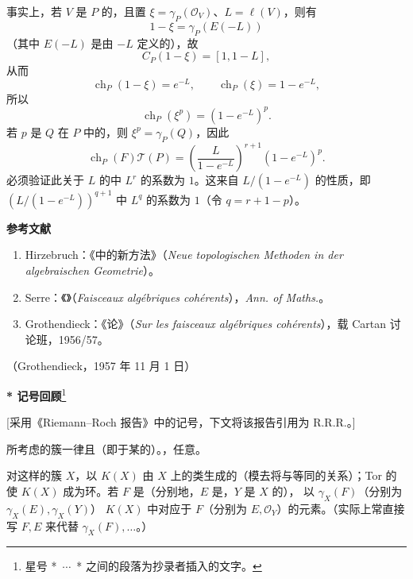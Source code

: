 事实上，若 $V$ 是 $P$ 的，且置 $\xi=\gamma_P(\mathcal O_V)$、$L=\ell(V)$，则有
\[
1-\xi=\gamma_P(E(-L))
\]
（其中 $E(-L)$ 是由 $-L$ 定义的），故
\[
C_P(1-\xi)=[1,1-L],
\]
从而
\[
\operatorname{ch}_P(1-\xi)=e^{-L},\qquad
\operatorname{ch}_P(\xi)=1-e^{-L},
\]
所以
\[
\operatorname{ch}_P(\xi^p)=(1-e^{-L})^p.
\]
若 $p$ 是 $Q$ 在 $P$ 中的，则 $\xi^p=\gamma_P(Q)$，因此
\[
\operatorname{ch}_P(F)\mathscr T(P)=\left(\frac{L}{1-e^{-L}}\right)^{r+1}(1-e^{-L})^p.
\]
必须验证此关于 $L$ 的中 $L^r$ 的系数为 $1$。这来自 $L/(1-e^{-L})$ 的性质，即 $(L/(1-e^{-L}))^{q+1}$ 中 $L^q$ 的系数为 $1$（令 $q=r+1-p$）。

\textbf{参考文献}
\begin{enumerate}
\item[{[1]}] Hirzebruch：《中的新方法》（\textit{Neue topologischen Methoden in der algebraischen Geometrie}）。
\item[{[2]}] Serre：《》（\textit{Faisceaux algébriques cohérents}），\textit{Ann. of Maths.}。
\item[{[3]}] Grothendieck：《论》（\textit{Sur les faisceaux algébriques cohérents}），载 Cartan 讨论班，1956/57。
\end{enumerate}

\begin{center}（Grothendieck，1957 年 11 月 1 日）\end{center}
\textbf{* 记号回顾}\footnote{星号 *\ $\cdots$\ * 之间的段落为抄录者插入的文字。}

[采用《Riemann--Roch 报告》中的记号，下文将该报告引用为 R.R.R.。]

所考虑的簇一律且（即于某的）。，任意。

对这样的簇 $X$，以 $K(X)$ 由 $X$ 上的类生成的（模去将与等同的关系）；Tor 的使 $K(X)$ 成为环。若 $F$ 是（分别地，$E$ 是，$Y$ 是 $X$ 的），
以 $\gamma_X(F)$（分别为 $\gamma_X(E),\gamma_X(Y)$） $K(X)$ 中对应于 $F$（分别为 $E,\mathcal O_Y$）的元素。（实际上常直接写 $F,E$ 来代替 $\gamma_X(F),\ldots$。）

